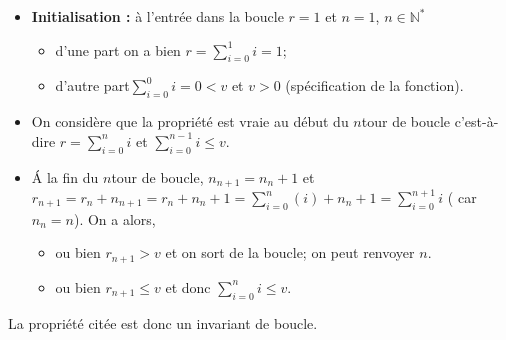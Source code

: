 \begin{itemize}
\item \textbf{Initialisation : }à l'entrée dans la boucle $r=1$ et $n=1$, $n\in\mathbb{N}^*$
\begin{itemize}
\item d'une part  on a bien $r=\sum\limits_{i=0}^1 i = 1$;
\item d'autre part$  \sum\limits_{i=0}^{0}i =0 < v$ et $v>0$ (spécification de la fonction).
\end{itemize}
\item On considère que la propriété est vraie au début du $n$\ieme  tour de boucle c'est-à-dire $r=\sum\limits_{i=0}^n i$ et $\sum\limits_{i=0}^{n-1} i \leq v$.
\item \'A la fin du $n$\ieme  tour de boucle, $n_{n+1} = n_n+1$ et 
$r_{n+1} = r_n + n_{n+1}=r_n+n_n+1 = \sum\limits_{i=0}^n \left(i\right)+n_n+1  = \sum\limits_{i=0}^{n+1} i$ ( car $n_n = n$). 
On a alors, 
\begin{itemize}
\item ou bien $r_{n+1}>v$ et on sort de la boucle; on peut renvoyer $n$.
\item ou bien $r_{n+1}\leq v$ et donc $\sum\limits_{i=0}^{n} i \leq v$. 
\end{itemize}
%
\end{itemize}
La propriété citée est donc un invariant de boucle. 
%
